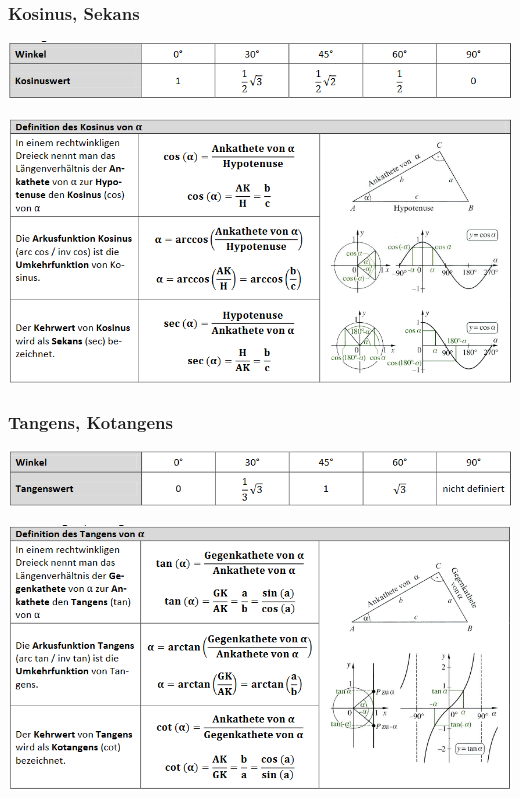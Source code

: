 \subsubsection{Kosinus, Sekans}
\includegraphics[scale=0.7]{kossek1.PNG}

\includegraphics[scale=0.7]{kossek2.PNG}
\subsubsection{Tangens, Kotangens}
\includegraphics[scale=0.7]{tanko1.PNG}

\includegraphics[scale=0.7]{tanko2.PNG}


